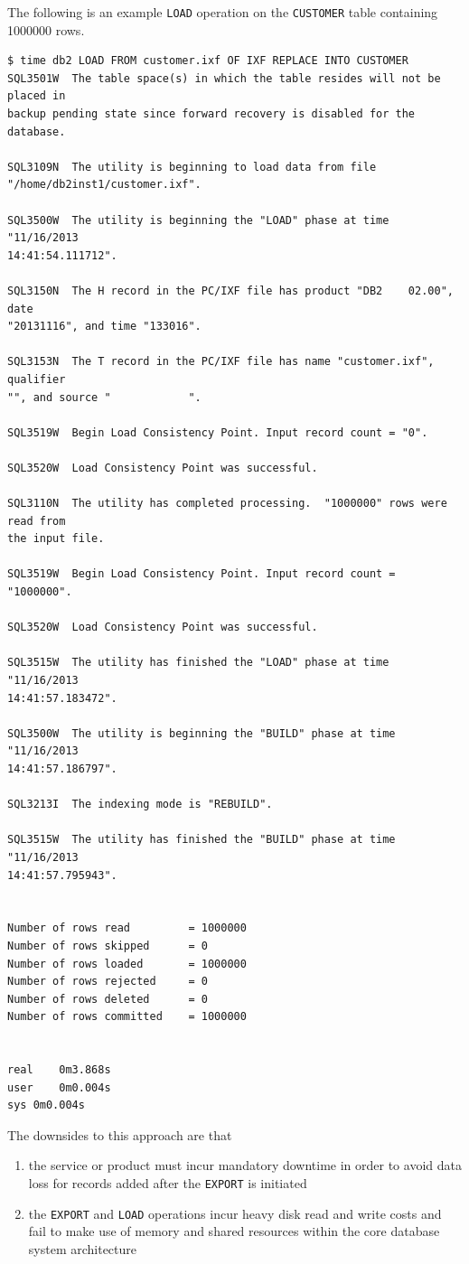 \documentclass[letterpaper]{article}%
\begin{document}
The following is an example \texttt{LOAD} operation on the \texttt{CUSTOMER}
table containing 1000000 rows.
\begin{Verbatim}[frame=single]
$ time db2 LOAD FROM customer.ixf OF IXF REPLACE INTO CUSTOMER
SQL3501W  The table space(s) in which the table resides will not be placed in
backup pending state since forward recovery is disabled for the database.

SQL3109N  The utility is beginning to load data from file
"/home/db2inst1/customer.ixf".

SQL3500W  The utility is beginning the "LOAD" phase at time "11/16/2013
14:41:54.111712".

SQL3150N  The H record in the PC/IXF file has product "DB2    02.00", date
"20131116", and time "133016".

SQL3153N  The T record in the PC/IXF file has name "customer.ixf", qualifier
"", and source "            ".

SQL3519W  Begin Load Consistency Point. Input record count = "0".

SQL3520W  Load Consistency Point was successful.

SQL3110N  The utility has completed processing.  "1000000" rows were read from
the input file.

SQL3519W  Begin Load Consistency Point. Input record count = "1000000".

SQL3520W  Load Consistency Point was successful.

SQL3515W  The utility has finished the "LOAD" phase at time "11/16/2013
14:41:57.183472".

SQL3500W  The utility is beginning the "BUILD" phase at time "11/16/2013
14:41:57.186797".

SQL3213I  The indexing mode is "REBUILD".

SQL3515W  The utility has finished the "BUILD" phase at time "11/16/2013
14:41:57.795943".


Number of rows read         = 1000000
Number of rows skipped      = 0
Number of rows loaded       = 1000000
Number of rows rejected     = 0
Number of rows deleted      = 0
Number of rows committed    = 1000000


real    0m3.868s
user    0m0.004s
sys 0m0.004s
\end{Verbatim}

The downsides to this approach are that
\begin{enumerate}[1.]
  \item the service or product must incur mandatory downtime in order to avoid
    data loss for records added after the \texttt{EXPORT} is initiated
  \item the \texttt{EXPORT} and \texttt{LOAD} operations incur heavy disk read
    and write costs and fail to make use of memory and shared resources within
    the core database system architecture
\end{enumerate}
\end{document}
